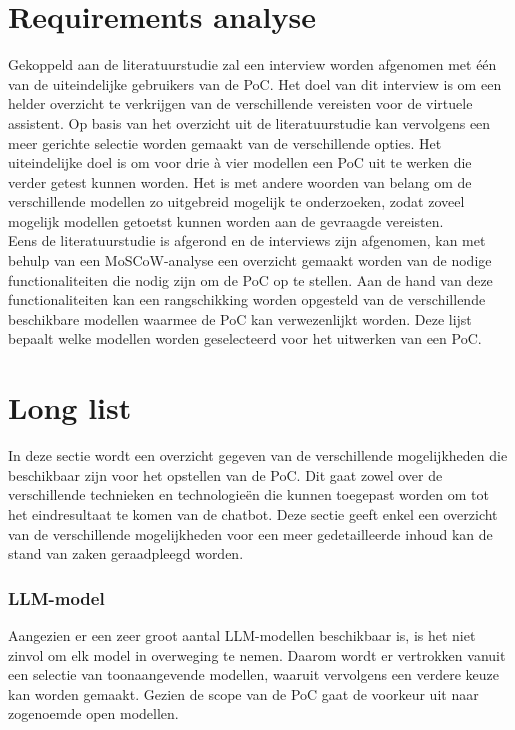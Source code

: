 \section{Requirements analyse}


Gekoppeld aan de literatuurstudie zal een interview worden afgenomen met één van de uiteindelijke gebruikers van de PoC. Het doel van dit interview is om een helder overzicht te verkrijgen van de verschillende vereisten voor de virtuele assistent. Op basis van het overzicht uit de literatuurstudie kan vervolgens een meer gerichte selectie worden gemaakt van de verschillende opties. Het uiteindelijke doel is om voor drie à vier modellen een PoC uit te werken die verder getest kunnen worden. Het is met andere woorden van belang om de verschillende modellen zo uitgebreid mogelijk te onderzoeken, zodat zoveel mogelijk modellen getoetst kunnen worden aan de gevraagde vereisten. 
\\[1em]
Eens de literatuurstudie is afgerond en de interviews zijn afgenomen, kan met behulp van een MoSCoW-analyse een overzicht gemaakt worden van de nodige functionaliteiten die nodig zijn om de PoC op te stellen. Aan de hand van deze functionaliteiten kan een rangschikking worden opgesteld van de verschillende beschikbare modellen waarmee de PoC kan verwezenlijkt worden. Deze lijst bepaalt welke modellen worden geselecteerd voor het uitwerken van een PoC.

\section{Long list}

In deze sectie wordt een overzicht gegeven van de verschillende mogelijkheden die beschikbaar zijn voor het opstellen van de PoC. Dit gaat zowel over de verschillende technieken en technologieën die kunnen toegepast worden om tot het eindresultaat te komen van de chatbot. Deze sectie geeft enkel een overzicht van de verschillende mogelijkheden voor een meer gedetailleerde inhoud kan de stand van zaken geraadpleegd worden.

\subsubsection{LLM-model}

Aangezien er een zeer groot aantal LLM-modellen beschikbaar is, is het niet zinvol om elk model in overweging te nemen. Daarom wordt er vertrokken vanuit een selectie van toonaangevende modellen, waaruit vervolgens een verdere keuze kan worden gemaakt. Gezien de scope van de PoC gaat de voorkeur uit naar zogenoemde open modellen.

